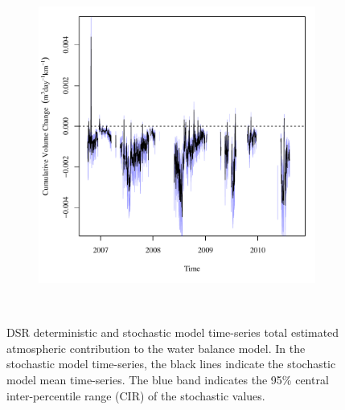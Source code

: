\begin{landscape}
\begin{figure}
\begin{subfigure}{0.7\textwidth}
			\includegraphics[width=\tableCustomSize]{"Figures/Results_DSR/Stochastic/Balance Water - atm"}
		\end{subfigure}\\
		\caption[DSR deterministic and stochastic model time-series total estimated atmospheric contribution to the water balance model.]{DSR deterministic and stochastic model time-series total estimated atmospheric contribution to the water balance model.  In the stochastic model time-series, the black lines indicate the stochastic model mean time-series.  The blue band indicates the 95\% central inter-percentile range (CIR) of the stochastic values.}
		\label{fig:reachAtm_DS}
	\end{figure}
\end{landscape}

